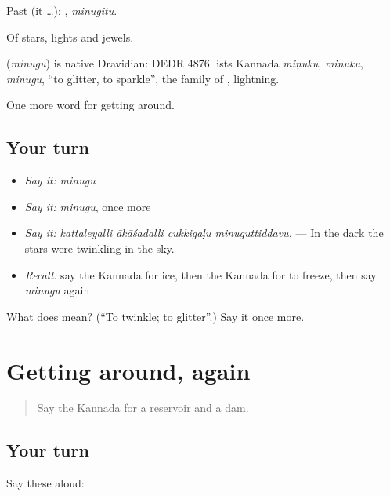 Past (it …): , \emph{minugitu}.

Of stars, lights and jewels.

\begin{cousinweb}
\textbf{} (\emph{minugu}) is native Dravidian: DEDR 4876 lists Kannada \emph{miṇuku}, \emph{minuku}, \emph{minugu}, \textquotedblleft{}to glitter, to sparkle\textquotedblright{}, the family of , lightning.
\end{cousinweb}

\begin{grammarlens}[title={What you've built}]
One more word for getting around.
\end{grammarlens}

\subsection*{Your turn}
\begin{itemize}
\raggedright
  \item \emph{Say it:} \emph{minugu}
  \item \emph{Say it:} \emph{minugu}, once more
  \item \emph{Say it:} \emph{kattaleyalli ākāśadalli cukkigaḷu minuguttiddavu.} — In the dark the stars were twinkling in the sky.
  \item \emph{Recall:} say the Kannada for ice, then the Kannada for to freeze, then say \emph{minugu} again
\end{itemize}

\begin{tcolorbox}[breakable,colback=teal!4,colframe=teal!35!black,title={Before you move on}]
What does  mean? (\textquotedblleft{}To twinkle; to glitter\textquotedblright{}.) Say it once more.
\end{tcolorbox}
\section[(dialogue)]{Getting around, again}

\label{lesson:KA-R489-review-483-489}



\begin{quote}
Say the Kannada for a reservoir and a dam.
\end{quote}

\subsection*{Your turn}
Say these aloud:

